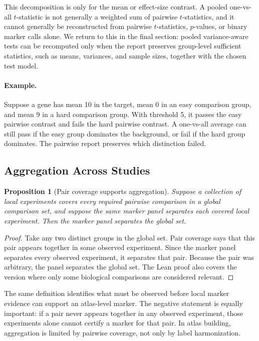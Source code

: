 \documentclass{article}
\newtheorem{proposition}{Proposition}
\begin{document}
This decomposition is only for the mean or effect-size contrast. A pooled one-vs-all $t$-statistic is not generally a weighted sum of pairwise $t$-statistics, and it cannot generally be reconstructed from pairwise $t$-statistics, $p$-values, or binary marker calls alone. We return to this in the final section: pooled variance-aware tests can be recomputed only when the report preserves group-level sufficient statistics, such as means, variances, and sample sizes, together with the chosen test model.

\paragraph{Example.}
Suppose a gene has mean 10 in the target, mean 0 in an easy comparison group, and mean 9 in a hard comparison group. With threshold 5, it passes the easy pairwise contrast and fails the hard pairwise contrast. A one-vs-all average can still pass if the easy group dominates the background, or fail if the hard group dominates. The pairwise report preserves which distinction failed.

\subsection{Aggregation Across Studies}

\begin{proposition}[Pair coverage supports aggregation]\label{prop:pair-coverage-aggregation}
Suppose a collection of local experiments covers every required pairwise comparison in a global comparison set, and suppose the same marker panel separates each covered local experiment. Then the marker panel separates the global set.
\end{proposition}

\begin{proof}
Take any two distinct groups in the global set. Pair coverage says that this pair appears together in some observed experiment. Since the marker panel separates every observed experiment, it separates that pair. Because the pair was arbitrary, the panel separates the global set. The Lean proof also covers the version where only some biological comparisons are considered relevant.
\end{proof}

The same definition identifies what must be observed before local marker evidence can support an atlas-level marker. The negative statement is equally important: if a pair never appears together in any observed experiment, those experiments alone cannot certify a marker for that pair. In atlas building, aggregation is limited by pairwise coverage, not only by label harmonization.
\end{document}
